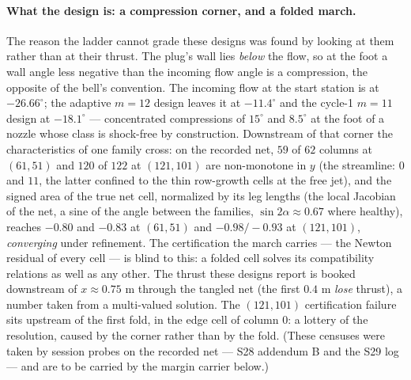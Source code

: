 \paragraph{What the design is: a compression corner, and a folded
march.} The reason the ladder cannot grade these designs was found by
looking at them rather than at their thrust. The plug's wall lies
\emph{below} the flow, so at the foot a wall angle less negative than
the incoming flow angle is a compression, the opposite of the bell's
convention. The incoming flow at the start station is at
$-26.66^\circ$; the adaptive $m = 12$ design leaves it at
$-11.4^\circ$ and the cycle-1 $m = 11$ design at $-18.1^\circ$ ---
concentrated compressions of $15^\circ$ and $8.5^\circ$ at the foot
of a nozzle whose class is shock-free by construction. Downstream of
that corner the characteristics of one family cross: on the recorded
net, $59$ of $62$ columns at $(61,51)$ and $120$ of $122$ at
$(121,101)$ are non-monotone in $y$ (the streamline: $0$ and $11$,
the latter confined to the thin row-growth cells at the free jet),
and the signed area of the true net cell, normalized by its leg
lengths (the local Jacobian of the net, a sine of the angle between
the families, $\sin 2\alpha \approx 0.67$ where healthy), reaches
$-0.80$ and $-0.83$ at $(61,51)$ and $-0.98/-0.93$ at $(121,101)$,
\emph{converging} under refinement. The certification the march
carries --- the Newton residual of every cell --- is blind to this:
a folded cell solves its compatibility relations as well as any
other. The thrust these designs report is booked downstream of
$x \approx 0.75$ m through the tangled net (the first $0.4$ m
\emph{lose} thrust), a number taken from a multi-valued solution.
The $(121,101)$ certification failure sits upstream of the first
fold, in the edge cell of column 0: a lottery of the resolution,
caused by the corner rather than by the fold. (These censuses were
taken by session probes on the recorded net --- S28 addendum B and
the S29 log --- and are to be carried by the margin carrier below.)

